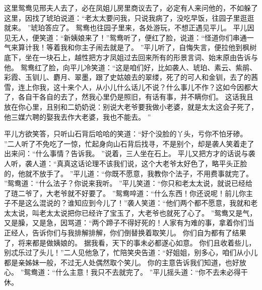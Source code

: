 \par
这里鸳鸯见邢夫人去了，必在凤姐儿房里商议去了，必定有人来问他的，不如躲了这里，因找了琥珀说道：“老太太要问我，只说我病了，没吃早饭，往园子里逛逛就来。
”琥珀答应了。
鸳鸯也往园子里来，各处游玩，不想正遇见平儿。
平儿因见无人，便笑道：“新姨娘来了！”鸳鸯听了，便红了脸，说道：“怪道你们串通一气来算计我！等着我和你主子闹去就是了。
”平儿听了，自悔失言，便拉他到枫树底下，坐在一块石上，越性把方才凤姐过去回来所有的形景言词、始末原由告诉与他。
鸳鸯红了脸，向平儿冷笑道：“这是咱们好，比如袭人、琥珀、素云、紫鹃、彩霞、玉钏儿、麝月、翠墨，跟了史姑娘去的翠缕，死了的可人和金钏，去了的茜雪，连上你我，这十来个人，从小儿什么话儿不说？什么事儿不作？这如今因都大了，各自干各自的去了，然我心里仍是照旧，有话有事，并不瞒你们。
这话我且放在你心里，且别和二奶奶说：别说大老爷要我做小老婆，就是太太这会子死了，他三媒六聘的娶我去作大老婆，我也不能去。
”\par
平儿方欲笑答，只听山石背后哈哈的笑道：“好个没脸的丫头，亏你不怕牙碜。
”二人听了不免吃了一惊，忙起身向山石背后找寻，不是别个，却是袭人笑着走了出来问：“什么事情？告诉我。
”说着，三人坐在石上。
平儿又把方才的话说与袭人听，袭人道：“真真这话论理不该我们说，这个大老爷太好色了，略平头正脸的，他就不放手了。
”平儿道：“你既不愿意，我教你个法子，不用费事就完了。
”鸳鸯道：“什么法子？你说来我听。
”平儿笑道：“你只和老太太说，就说已经给了琏二爷了，大老爷就不好要了。
”鸳鸯啐道：“什么东西！你还说呢！前儿你主子不是这么混说的？谁知应到今儿了！”袭人笑道：“他们两个都不愿意，我就和老太太说，叫老太太说把你已经许了宝玉了，大老爷也就死了心了。
”鸳鸯又是气，又是臊，又是急，因骂道：“两个蹄子不得好死的！人家有为难的事，拿着你们当正经人，告诉你们与我排解排解，你们倒替换着取笑儿。
你们自为都有了结果了，将来都是做姨娘的。
据我看，天下的事未必都遂心如意。
你们且收着些儿，别忒乐过了头儿！”二人见他急了，忙陪笑央告道：“好姐姐，别多心，咱们从小儿都是亲姊妹一般，不过无人处偶然取个笑儿。
你的主意告诉我们知道，也好放心。
”鸳鸯道：“什么主意！我只不去就完了。
”平儿摇头道：“你不去未必得干休。
